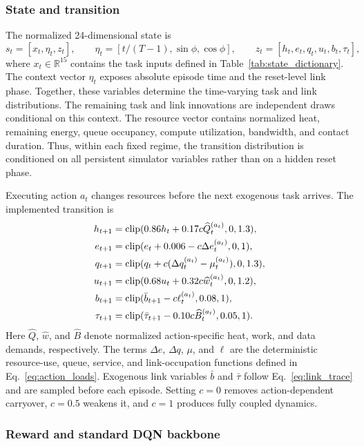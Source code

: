 \documentclass[remotesensing,article,submit,moreauthors]{Definitions/mdpi}
\newcommand{\R}{\mathbb{R}}
\DeclareMathOperator{\clip}{clip}
\begin{document}
\subsubsection{State and transition}

The normalized 24-dimensional state is
\begin{equation}
s_t=[x_t,\eta_t,z_t],\qquad
\eta_t=[t/(T-1),\sin\phi,\cos\phi],\qquad
z_t=[h_t,e_t,q_t,u_t,b_t,\tau_t],
\end{equation}
where $x_t\in\R^{15}$ contains the task inputs defined in Table~\ref{tab:state_dictionary}. The context vector $\eta_t$ exposes absolute episode time and the reset-level link phase. Together, these variables determine the time-varying task and link distributions. The remaining task and link innovations are independent draws conditional on this context. The resource vector contains normalized heat, remaining energy, queue occupancy, compute utilization, bandwidth, and contact duration. Thus, within each fixed regime, the transition distribution is conditioned on all persistent simulator variables rather than on a hidden reset phase.

Executing action $a_t$ changes resources before the next exogenous task arrives. The implemented transition is
\begin{align}
h_{t+1}&=\clip(0.86h_t+0.17c\widehat Q_t^{(a_t)},0,1.3),\notag\\
e_{t+1}&=\clip(e_t+0.006-c\Delta e_t^{(a_t)},0,1),\notag\\
q_{t+1}&=\clip(q_t+c(\Delta q_t^{(a_t)}-\mu_t^{(a_t)}),0,1.3),\notag\\
u_{t+1}&=\clip(0.68u_t+0.32c\widehat w_t^{(a_t)},0,1.2),\notag\\
b_{t+1}&=\clip(\bar b_{t+1}-c\ell_t^{(a_t)},0.08,1),\notag\\
\tau_{t+1}&=\clip(\bar\tau_{t+1}-0.10c\widehat B_t^{(a_t)},0.05,1).
\label{eq:transition}
\end{align}
Here $\widehat Q$, $\widehat w$, and $\widehat B$ denote normalized action-specific heat, work, and data demands, respectively. The terms $\Delta e$, $\Delta q$, $\mu$, and $\ell$ are the deterministic resource-use, queue, service, and link-occupation functions defined in Eq.~\eqref{eq:action_loads}. Exogenous link variables $\bar b$ and $\bar\tau$ follow Eq.~\eqref{eq:link_trace} and are sampled before each episode. Setting $c=0$ removes action-dependent carryover, $c=0.5$ weakens it, and $c=1$ produces fully coupled dynamics.

\subsubsection{Reward and standard DQN backbone}
\end{document}

